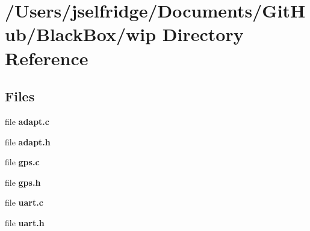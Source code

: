\section{/\+Users/jselfridge/\+Documents/\+Git\+Hub/\+Black\+Box/wip Directory Reference}
\label{dir_505fa3262384b3ce75b16f461d144e72}
\subsection*{Files}
\begin{DoxyCompactItemize}
\item 
file \textbf{ adapt.\+c}
\item 
file \textbf{ adapt.\+h}
\item 
file \textbf{ gps.\+c}
\item 
file \textbf{ gps.\+h}
\item 
file \textbf{ uart.\+c}
\item 
file \textbf{ uart.\+h}
\end{DoxyCompactItemize}
